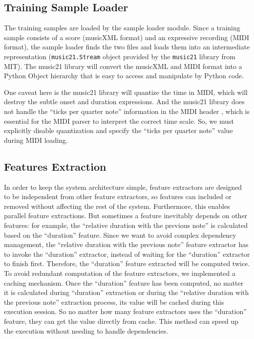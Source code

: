 
\subsection{Training Sample Loader}
   The training samples are loaded by the sample loader module. Since a training sample  consists of a score (musicXML format) and an expressive recording (MIDI format), the sample loader finds the two files and loads them into an intermediate representation (\texttt{music21.Stream} object provided by the \texttt{music21} library \cite{music21} from MIT). The music21 library will convert the musicXML and MIDI format into a Python Object hierarchy that is easy to access and manipulate by Python code. 

   One caveat here is the music21 library will quantize the time in MIDI, which will destroy the subtle onset and duration expressions. And the music21 library does not handle the \enquote{ticks per quarter note} information in the MIDI header \cite{midispec}, which is essential for the MIDI parser to interpret the correct time scale. So, we must explicitly disable quantization and specify the \enquote{ticks per quarter note} value during MIDI loading.

\subsection{Features Extraction}
In order to keep the system architecture simple, feature extractors are designed to be independent from other feature extractors, so features can included or removed without affecting the rest of the system. Furthermore, this enables parallel feature extractions. But sometimes a feature inevitably depends on other features: for example, the \enquote{relative duration with the previous note} is calculated based on the \enquote{duration} feature. Since we want to avoid complex dependency management, the \enquote{relative duration with the previous note} feature extractor has to invoke the \enquote{duration} extractor, instead of waiting for the \enquote{duration} extractor to finish first. Therefore, the \enquote{duration} feature extracted will be computed twice. To avoid redundant computation of the feature extractors, we implemented a caching mechanism. Once the \enquote{duration} feature has been computed, no matter it is calculated during \enquote{duration} extraction or during the \enquote{relative duration with the previous note} extraction process, its value will be cached during this execution session. So no matter how many feature extractors uses the \enquote{duration} feature, they can get the value directly from cache. This method can speed up the execution without needing to handle dependencies.

